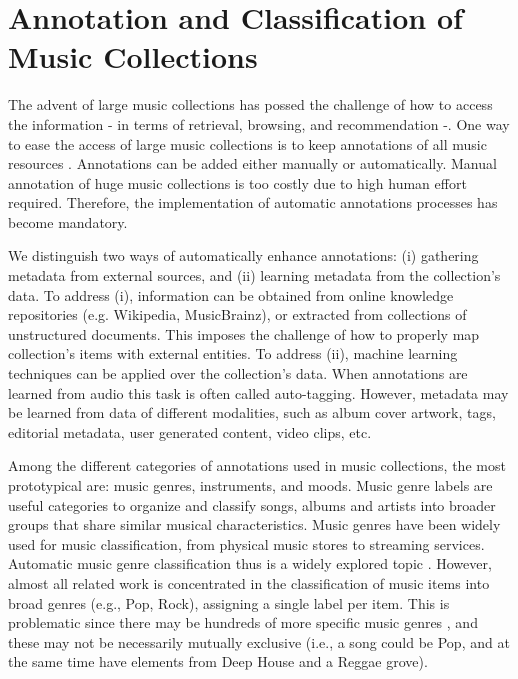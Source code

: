 \section{Annotation and Classification of Music Collections}
\label{sec:intro:annotation}

The advent of large music collections has possed the challenge of how to access the information - in terms of retrieval, browsing, and recommendation -. One way to ease the access of large music collections is to keep annotations of all music resources \cite{sordo2012semantic}. Annotations can be added either manually or automatically. Manual annotation of huge music collections is too costly due to high human effort required. Therefore, the implementation of automatic annotations processes has become mandatory. 

We distinguish two ways of automatically enhance annotations: (i) gathering metadata from external sources, and (ii) learning metadata from the collection's data. To address (i), information can be obtained from online knowledge repositories (e.g. Wikipedia, MusicBrainz), or extracted from collections of unstructured documents. This imposes the challenge of how to properly map collection's items with external entities. To address (ii), machine learning techniques can be applied over the collection's data. When annotations are learned from audio this task is often called auto-tagging. However, metadata may be learned from data of different modalities, such as album cover artwork, tags, editorial metadata, user generated content, video clips, etc.

Among the different categories of annotations used in music collections, the most prototypical are: music genres, instruments, and moods. 
Music genre labels are useful categories to organize and classify songs, albums and artists into broader groups that share similar musical characteristics. Music genres have been widely used for music classification, from physical music stores to streaming services. Automatic music genre classification thus is a widely explored topic \citep{sturm2012survey}.
However, almost all related work is concentrated in the classification of music items into broad genres (e.g., Pop, Rock), assigning a single label per item. This is problematic since there may be hundreds of more specific music genres \cite{pachet2000taxonomy}, and these may not be necessarily mutually exclusive (i.e., a song could be Pop, and at the same time have elements from Deep House and a Reggae grove). 

